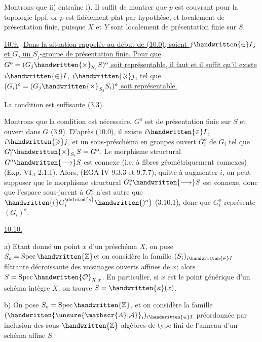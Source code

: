 Montrons que ii) entraîne i). Il suffit de montrer que $p$ est couvrant pour la topologie fppf; or $p$ est fidèlement plat par hypothèse, et localement de présentation finie, puisque $X$ et $Y$ sont localement de présentation finie sur $S$.

\uline{10.9.}- \uline{Dans la situation rappelée au début de (10.0), soient $j\handwritten{\in}I$, et $G_j$ un $S_j$-groupe de présentation finie. Pour que $G^o=(G_j\handwritten{\times}_{S_j}S)^o$ soit représentable, il faut et il suffit qu'il existe  $i\handwritten{\in}I$, $i\handwritten{\geqslant}j$, tel que $(G_i)^o=(G_j\handwritten{\times}_{S_j}S_i)^o$ soit représentable.}

La condition est suffisante (3.3).

Montrons que la condition est nécessaire.  $G^o$ est de présentation finie sur $S$ et ouvert dans $G$ (3.9). D'après (10.0), il existe $i\handwritten{\in}I$, $i\handwritten{\geqslant}j$, et un sous-préschéma en groupes ouvert $G_i^o$ de $G_i$ tel que $G_i^o\handwritten{\times}_{S_i}S=G^o$. Le morphisme structural $G^o\handwritten{\longrightarrow}S$ est connexe (i.e. à fibres géométriquement connexes)(Exp. $\mathrm{VI}_A$ 2.1.1). Alors, (EGA IV 9.3.3 et 9.7.7), quitte à augmenter $i$, on peut supposer que le morphisme structural $G_i^o\handwritten{\longrightarrow}S$ est connexe, donc que l'espace sous-jacent à $G_i^o$ n'est autre que \uline{$\handwritten{(}G_i^{\deleted{o}}\handwritten{)^o}$} (3.10.1), donc que $G_i^o$ représente $(G_i)^o$.

\uline{10.10.} 

a) Etant donné un point $x$ d'un préschéma $X$, on pose $S_o=\operatorname{Spec}\handwritten{\mathbb{Z}}$\handwritten{/}et on considère la famille $(S_i)_{i\handwritten{\in}I}$ filtrante décroissante des voisinages  ouverts affines de $x$; alors $S=\operatorname{Spec}\handwritten{\mathcal{O}}_{X,x}$. En particulier, si $x$ est le point générique d'un schéma intègre $X$, on trouve $S=\handwritten{\kappa}(x)$.

b) On pose $S_o=\operatorname{Spec}\handwritten{\mathbb{Z}}$, et on considère la famille $(\handwritten{\unsure{\mathscr{A}|\mathcal{A}}}_i)_{i\handwritten{\in}I}$ préordonnée par inclusion des sous-$\handwritten{\mathbb{Z}}$-algèbres de type fini de l'anneau d'un schéma affine $S$.


